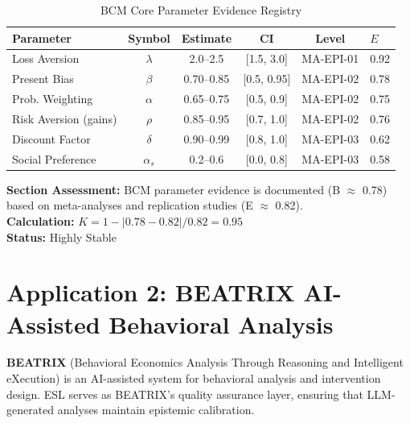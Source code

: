 \documentclass[11pt,a4paper]{article}
\begin{document}
\begin{table}[h]
\centering
\caption{BCM Core Parameter Evidence Registry}
\label{tab:BCM-params}
\begin{tabular}{lccccl}
\toprule
\textbf{Parameter} & \textbf{Symbol} & \textbf{Estimate} & \textbf{CI} & \textbf{Level} & \textbf{$E$} \\
\midrule
Loss Aversion & $\lambda$ & 2.0--2.5 & [1.5, 3.0] & MA-EPI-01 & 0.92 \\
Present Bias & $\beta$ & 0.70--0.85 & [0.5, 0.95] & MA-EPI-02 & 0.78 \\
Prob. Weighting & $\alpha$ & 0.65--0.75 & [0.5, 0.9] & MA-EPI-02 & 0.75 \\
Risk Aversion (gains) & $\rho$ & 0.85--0.95 & [0.7, 1.0] & MA-EPI-02 & 0.76 \\
Discount Factor & $\delta$ & 0.90--0.99 & [0.8, 1.0] & MA-EPI-03 & 0.62 \\
Social Preference & $\alpha_s$ & 0.2--0.6 & [0.0, 0.8] & MA-EPI-03 & 0.58 \\
\bottomrule
\end{tabular}
\end{table}

\begin{eslbox}
\textbf{Section Assessment:} BCM parameter evidence is documented (B $\approx$ 0.78) based on meta-analyses and replication studies (E $\approx$ 0.82). \\[0.3em]
\textbf{Calculation:} $K = 1 - |0.78 - 0.82| / 0.82 = 0.95$ \\
\textbf{Status:} Highly Stable
\end{eslbox}

\section{Application 2: BEATRIX AI-Assisted Behavioral Analysis}
\label{sec:application-beatrix}


\textbf{BEATRIX} (Behavioral Economics Analysis Through Reasoning and Intelligent eXecution) is an AI-assisted system for behavioral analysis and intervention design. ESL serves as BEATRIX's quality assurance layer, ensuring that LLM-generated analyses maintain epistemic calibration.
\end{document}

